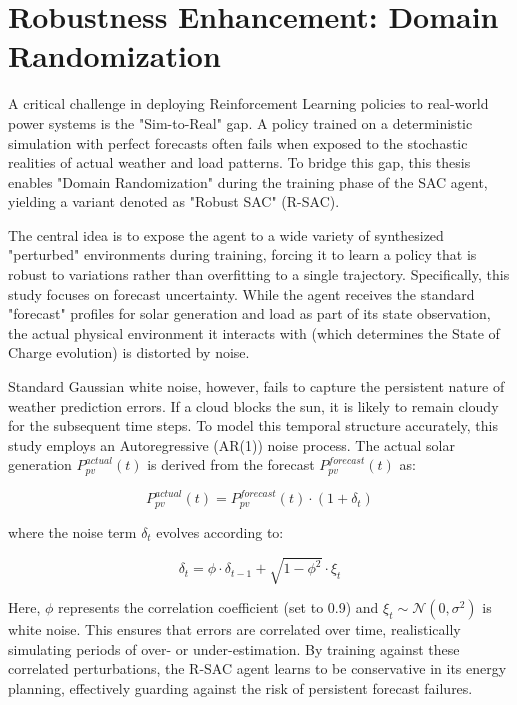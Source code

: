 
\section{Robustness Enhancement: Domain Randomization}

A critical challenge in deploying Reinforcement Learning policies to real-world power systems is the "Sim-to-Real" gap. A policy trained on a deterministic simulation with perfect forecasts often fails when exposed to the stochastic realities of actual weather and load patterns. To bridge this gap, this thesis enables "Domain Randomization" \cite{Tobin2017} during the training phase of the SAC agent, yielding a variant denoted as "Robust SAC" (R-SAC).

The central idea is to expose the agent to a wide variety of synthesized "perturbed" environments during training, forcing it to learn a policy that is robust to variations rather than overfitting to a single trajectory. Specifically, this study focuses on forecast uncertainty. While the agent receives the standard "forecast" profiles for solar generation and load as part of its state observation, the actual physical environment it interacts with (which determines the State of Charge evolution) is distorted by noise.

Standard Gaussian white noise, however, fails to capture the persistent nature of weather prediction errors. If a cloud blocks the sun, it is likely to remain cloudy for the subsequent time steps. To model this temporal structure accurately, this study employs an Autoregressive (AR(1)) noise process. The actual solar generation $P_{pv}^{actual}(t)$ is derived from the forecast $P_{pv}^{forecast}(t)$ as:

\begin{equation}
    P_{pv}^{actual}(t) = P_{pv}^{forecast}(t) \cdot (1 + \delta_t)
\end{equation}

where the noise term $\delta_t$ evolves according to:

\begin{equation}
    \delta_t = \phi \cdot \delta_{t-1} + \sqrt{1 - \phi^2} \cdot \xi_t
\end{equation}

Here, $\phi$ represents the correlation coefficient (set to 0.9) and $\xi_t \sim \mathcal{N}(0, \sigma^2)$ is white noise. This ensures that errors are correlated over time, realistically simulating periods of over- or under-estimation. By training against these correlated perturbations, the R-SAC agent learns to be conservative in its energy planning, effectively guarding against the risk of persistent forecast failures.
